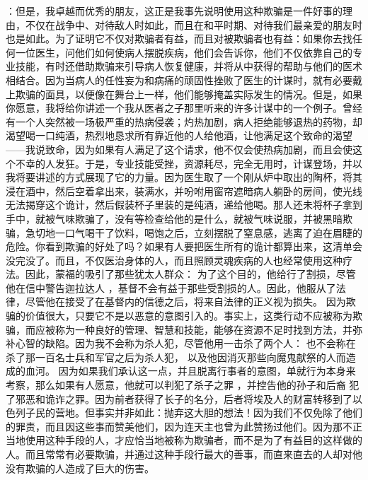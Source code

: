 ：但是，我卓越而优秀的朋友，这正是我事先说明使用这种欺骗是一件好事的理由，不仅在战争中、对待敌人时如此，而且在和平时期、对待我们最亲爱的朋友时也是如此。为了证明它不仅对欺骗者有益，而且对被欺骗者也有益：如果你去找任何一位医生，问他们如何使病人摆脱疾病，他们会告诉你，他们不仅依靠自己的专业技能，有时还借助欺骗来引导病人恢复健康，并将从中获得的帮助与他们的医术相结合。因为当病人的任性妄为和病痛的顽固性挫败了医生的计谋时，就有必要戴上欺骗的面具，以便像在舞台上一样，他们能够掩盖实际发生的情况。但是，如果你愿意，我将给你讲述一个我从医者之子那里听来的许多计谋中的一个例子。曾经有一个人突然被一场极严重的热病侵袭；灼热加剧，病人拒绝能够退热的药物，却渴望喝一口纯酒，热烈地恳求所有靠近他的人给他酒，让他满足这个致命的渴望——我说致命，因为如果有人满足了这个请求，他不仅会使热病加剧，而且会使这个不幸的人发狂。于是，专业技能受挫，资源耗尽，完全无用时，计谋登场，并以我将要讲述的方式展现了它的力量。因为医生取了一个刚从炉中取出的陶杯，将其浸在酒中，然后空着拿出来，装满水，并吩咐用窗帘遮暗病人躺卧的房间，使光线无法揭穿这个诡计，然后假装杯子里装的是纯酒，递给他喝。那人还未将杯子拿到手中，就被气味欺骗了，没有等检查给他的是什么，就被气味说服，并被黑暗欺骗，急切地一口气喝干了饮料，喝饱之后，立刻摆脱了窒息感，逃离了迫在眉睫的危险。你看到欺骗的好处了吗？如果有人要把医生所有的诡计都算出来，这清单会没完没了。而且，不仅医治身体的人，而且照顾灵魂疾病的人也经常使用这种疗法。因此，蒙福的吸引了那些犹太人群众： 为了这个目的，他给行了割损，尽管他在信中警告迦拉达人 ，基督不会有益于那些受割损的人。因此，他服从了法律，尽管他在接受了在基督内的信德之后，将来自法律的正义视为损失。 因为欺骗的价值很大，只要它不是以恶意的意图引入的。事实上，这类行动不应被称为欺骗，而应被称为一种良好的管理、智慧和技能，能够在资源不足时找到方法，并弥补心智的缺陷。因为我不会称为杀人犯，尽管他用一击杀了两个人： 也不会称在杀了那一百名士兵和军官之后为杀人犯， 以及他因消灭那些向魔鬼献祭的人而造成的血河。 因为如果我们承认这一点，并且脱离行事者的意图，单就行为本身来考察，那么如果有人愿意，他就可以判犯了杀子之罪 ，并控告他的孙子和后裔  犯了邪恶和诡诈之罪。因为前者获得了长子的名分，后者将埃及人的财富转移到了以色列子民的营地。但事实并非如此：抛弃这大胆的想法！因为我们不仅免除了他们的罪责，而且因这些事而赞美他们，因为连天主也曾为此赞扬过他们。因为那不正当地使用这种手段的人，才应恰当地被称为欺骗者，而不是为了有益目的这样做的人。而且常常有必要欺骗，并通过这种手段行最大的善事，而直来直去的人却对他没有欺骗的人造成了巨大的伤害。\par

